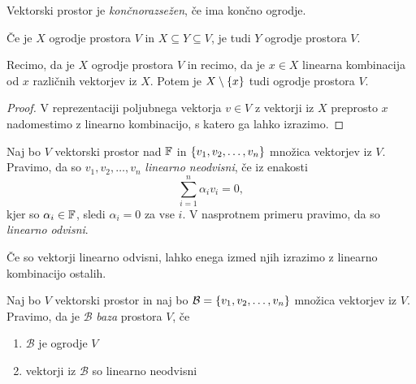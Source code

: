 \documentclass[12pt, a4paper]{article}
\begin{document}
\begin{okvir}
\begin{definicija}
Vektorski prostor je \emph{končnorazsežen}, če ima končno ogrodje.
\end{definicija}
\end{okvir}

\begin{trditev}
Če je $X$ ogrodje prostora $V$ in $X\subseteq Y\subseteq V$, je tudi $Y$ ogrodje prostora $V$.
\end{trditev}

\obvs

\begin{trditev}\label{td:ogrodja}
Recimo, da je $X$ ogrodje prostora $V$ in recimo, da je $x\in X$ linearna kombinacija od $x$ različnih vektorjev iz $X$. Potem je $X\setminus\left\{x\right\}$ tudi ogrodje prostora $V$.
\end{trditev}

\begin{proof}
V reprezentaciji poljubnega vektorja $v\in V$ z vektorji iz $X$ preprosto $x$ nadomestimo z linearno kombinacijo, s katero ga lahko izrazimo.
\end{proof}

\begin{definicija}
Naj bo $V$ vektorski prostor nad $\mathbb{F}$ in $\left\{v_1,v_2,\dots,v_n\right\}$ množica vektorjev iz $V$. Pravimo, da so $v_1,v_2,\dots,v_n$ \emph{linearno neodvisni}, če iz enakosti
\[
\sum_{i=1}^n\alpha_iv_i=0,
\]
kjer so $\alpha_i\in\mathbb{F}$, sledi $\alpha_i=0$ za vse $i$. V nasprotnem primeru pravimo, da so \emph{linearno odvisni}.
\end{definicija}

\begin{opomba}
Če so vektorji linearno odvisni, lahko enega izmed njih izrazimo z linearno kombinacijo ostalih.
\end{opomba}

\begin{okvir}
\begin{definicija}
Naj bo $V$ vektorski prostor in naj bo $\mathcal{B}=\left\{v_1,v_2,\dots,v_n\right\}$ množica vektorjev iz $V$. Pravimo, da je $\mathcal{B}$ \emph{baza} prostora $V$, če

\begin{enumerate}[label=\roman*)]
\item $\mathcal{B}$ je ogrodje $V$
\item vektorji iz $\mathcal{B}$ so linearno neodvisni
\end{enumerate}
\end{definicija}
\end{okvir}
\end{document}
